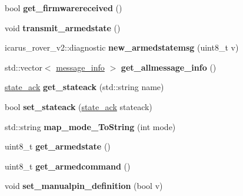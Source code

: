 \begin{DoxyCompactItemize}
bool {\bfseries get\+\_\+firmwarereceived} ()
\item 
\mbox{\label{classBoardControllerNodeProcess_a55883e1477ab44cf66e0fd4d94ea6fd9}} 
void {\bfseries transmit\+\_\+armedstate} ()
\item 
\mbox{\label{classBoardControllerNodeProcess_a8ba47d90ed32eb9bcb3dc8e1d7b5d8f6}} 
icarus\+\_\+rover\+\_\+v2\+::diagnostic {\bfseries new\+\_\+armedstatemsg} (uint8\+\_\+t v)
\item 
\mbox{\label{classBoardControllerNodeProcess_ac810c958f82c853bf9f2c8128b36dbf2}} 
std\+::vector$<$ \hyperlink{structmessage__info}{message\+\_\+info} $>$ {\bfseries get\+\_\+allmessage\+\_\+info} ()
\item 
\mbox{\label{classBoardControllerNodeProcess_a6d8da4e14514601f7c958ebd5b4a0edc}} 
\hyperlink{structstate__ack}{state\+\_\+ack} {\bfseries get\+\_\+stateack} (std\+::string name)
\item 
\mbox{\label{classBoardControllerNodeProcess_a82d170cbd2631f7a63c80506f2a74712}} 
bool {\bfseries set\+\_\+stateack} (\hyperlink{structstate__ack}{state\+\_\+ack} stateack)
\item 
\mbox{\label{classBoardControllerNodeProcess_a4a81b4b4aac4d605c2b774fd8aa6d16e}} 
std\+::string {\bfseries map\+\_\+mode\+\_\+\+To\+String} (int mode)
\item 
\mbox{\label{classBoardControllerNodeProcess_a7d68c0f35e4f1ee45c9cbc7124b4835f}} 
uint8\+\_\+t {\bfseries get\+\_\+armedstate} ()
\item 
\mbox{\label{classBoardControllerNodeProcess_a2f7ab482f62d762c29722cc19701ac52}} 
uint8\+\_\+t {\bfseries get\+\_\+armedcommand} ()
\item 
\mbox{\label{classBoardControllerNodeProcess_a19af9c5483f047ea069634c61dffdb54}} 
void {\bfseries set\+\_\+manualpin\+\_\+definition} (bool v)
\item 

\end{DoxyCompactItemize}
